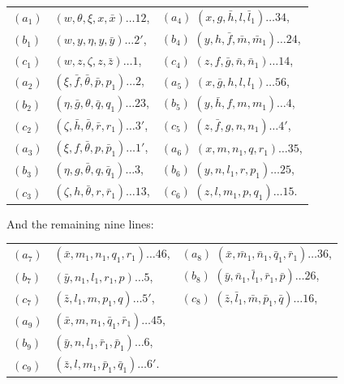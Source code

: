 \documentclass[12pt,a4paper]{article}
\begin{document}
\begin{center}
\begin{tabular}{lll}
$(a_1)$ & $(w, \theta, \xi, x, \bar{x}) \ldots 12$, & $(a_4)$ \quad $(x, g, \bar{h}, l, \bar{l}_1) \ldots 34$, \\
$(b_1)$ & $(w, y, \eta, y, \bar{y}) \ldots 2'$, & $(b_4)$ \quad $(y, h, \bar{f}, \bar{m}, \bar{m}_1) \ldots 24$, \\
$(c_1)$ & $(w, z, \zeta, z, \bar{z}) \ldots 1$, & $(c_4)$ \quad $(z, f, \bar{g}, \bar{n}, \bar{n}_1) \ldots 14$, \\
$(a_2)$ & $(\xi, \bar{f}, \bar{\theta}, \bar{p}, p_1) \ldots 2$, & $(a_5)$ \quad $(x, \bar{g}, h, l, l_1) \ldots 56$, \\
$(b_2)$ & $(\eta, \bar{g}, \theta, \bar{q}, q_1) \ldots 23$, & $(b_5)$ \quad $(y, \bar{h}, f, m, m_1) \ldots 4$, \\
$(c_2)$ & $(\zeta, \bar{h}, \bar{\theta}, \bar{r}, r_1) \ldots 3'$, & $(c_5)$ \quad $(z, \bar{f}, g, n, n_1) \ldots 4'$, \\
$(a_3)$ & $(\xi, f, \bar{\theta}, p, \bar{p}_1) \ldots 1'$, & $(a_6)$ \quad $(x, m, n_1, q, r_1) \ldots 35$, \\
$(b_3)$ & $(\eta, g, \bar{\theta}, q, \bar{q}_1) \ldots 3$, & $(b_6)$ \quad $(y, n, l_1, r, p_1) \ldots 25$, \\
$(c_3)$ & $(\zeta, h, \bar{\theta}, r, \bar{r}_1) \ldots 13$, & $(c_6)$ \quad $(z, l, m_1, p, q_1) \ldots 15$.
\end{tabular}
\end{center}

And the remaining nine lines:
\begin{center}
\begin{tabular}{lll}
$(a_7)$ & $(\bar{x}, m_1, n_1, q_1, r_1) \ldots 46$, & $(a_8)$ \quad $(\bar{x}, \bar{m}_1, \bar{n}_1, \bar{q}_1, \bar{r}_1) \ldots 36$, \\
$(b_7)$ & $(\bar{y}, n_1, l_1, r_1, p) \ldots 5$, & $(b_8)$ \quad $(\bar{y}, \bar{n}_1, \bar{l}_1, \bar{r}_1, \bar{p}) \ldots 26$, \\
$(c_7)$ & $(\bar{z}, l_1, m, p_1, q) \ldots 5'$, & $(c_8)$ \quad $(\bar{z}, \bar{l}_1, \bar{m}, \bar{p}_1, \bar{q}) \ldots 16$, \\
$(a_9)$ & $(\bar{x}, m, n_1, \bar{q}_1, \bar{r}_1) \ldots 45$, \\
$(b_9)$ & $(\bar{y}, n, l_1, \bar{r}_1, \bar{p}_1) \ldots 6$, \\
$(c_9)$ & $(\bar{z}, l, m_1, \bar{p}_1, \bar{q}_1) \ldots 6'$.
\end{tabular}
\end{center}
\end{document}
